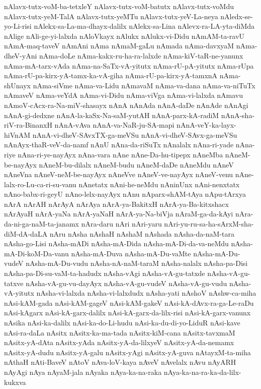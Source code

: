 {nAlavx-tutx-voM-ba-tetxleY
nAlavx-tutx-voM-batutx
nAlavx-tutx-voMdu
nAlavx-tutx-yeM-TalA
nAlavx-tutx-yeMTu
nAlavx-tutx-yeV-La-neya
nAledx-se-yo-Li-risi
nAlekx-sa-La-ma-dhayx-dalilx
nAlekx-sa-Lina
nAlevx-ra-LA-yta-diMda
nAlige
nAli-ge-yi-lalxda
nAloVkayx
nAlukx
nAlukx-vi-Didu
nAmAM-ta-ravU
nAmA-maq-taveV
nAmAni
nAma
nAmaM-gaLu
nAmada
nAma-davxyaM
nAma-dheV-yAni
nAma-doLe
nAma-kakx-ru-ha-ra-lalxde
nAma-kiV-taR-ne-yanunx
nAma-mA-tarx-vAda
nAma-na-SaTx-vA-yitutx
nAma-rU-pA-yitutx
nAma-rUpa
nAma-rU-pa-kirx-yA-tamx-ka-vA-giha
nAma-rU-pa-kirx-yA-tamxnA
nAma-shUnayx
nAma-siVme
nAma-va-Lidu
nAmavaM
nAma-va-dana
nAma-va-niTuTx
nAmaveV
nAma-veYdA
nAma-vi-Didu
nAma-viVga
nAma-vi-lalxda
nAmavu
nAmoV-cAcx-ra-Na-miV-shasayx
nAnA
nAnAda
nAnA-daDe
nAnAde
nAnAgi
nAnA-gi-dedxne
nAnA-la-kaSx-Na-saM-yutAH
nAnA-parx-kA-radiM
nAnA-sha-riV-ra-BinanxH
nAnA-vAva
nAnA-va-NaR-ju-SA-mapi
nAnA-veY-ka-layx-hiVnAM
nAnA-vi-dheV-SAvxTX-ga-meVSu
nAnA-vi-dheV-SAvx-ga-meVSu
nAnAyx-thaR-veV-da-namf
nAnU
nAna-da-riSuTx
nAnalalx
nAna-ri-yade
nAna-riye
nAna-ri-ye-nayAyx
nAna-vara
nAne
nAne-Da-hu-tipepx
nAneMba
nAneM-be-nayAyx
nAneM-bu-dilalx
nAneM-budu
nAneM-daDe
nAneMdu
nAneV
nAneVna
nAneV-neM-be-nayAyx
nAneVve
nAneV-ve-nayAyx
nAneV-venu
nAne-lalx-ro-Lu-ca-ri-su-vanu
nAnetatx
nAni-he-neMdu
nAninUnx
nAni-nenxtatx
nAno-babx-ri-geyU
nAno-lelx-nayAyx
nAnu
nAparx-shAM-tAya
nApu-tArxya
nArA
nArAH
nArAyA
nArAya
nArA-ya-BakitxH
nArA-ya-Ba-kitxshacx
nArAyaH
nArA-yaNa
nArA-yaNaH
nArA-ya-Na-biVja
nAraM-ga-da-kAyi
nAra-da-ni-ga-naM-ta-janamx
nAra-daru
nAri
nAri-yaru
nAri-yu-ru-sa-ha-sArxM-sha-diM-dA-daLA
nAru
nAsha
nAshaH
nAshaM
nAshada
nAsha-da-naM-tara
nAsha-go-Lisi
nAsha-mADi
nAsha-mA-Dida
nAsha-mA-Di-da-va-neMdu
nAsha-mA-Di-koM-Da-vanu
nAsha-mA-Duva
nAsha-mA-Du-vaMte
nAsha-mA-Du-vudeV
nAsha-mA-Du-vudu
nAsha-nA-naM-taraM
nAsha-nalalx
nAsha-pa-Disi
nAsha-pa-Di-su-vaM-ta-hadudx
nAsha-vAgi
nAsha-vA-gu-tatxde
nAsha-vA-gu-tatxve
nAsha-vA-gu-vu-dayAyx
nAsha-vA-gu-vudeV
nAsha-vA-gu-vudu
nAsha-vA-yitutx
nAsha-vi-lalxda
nAsha-vi-lalxdudx
nAsha-yati
nAshoV
nAshw-ca-miha
nAsi-kAM-gada
nAsi-kAM-gageV
nAsi-kAM-gakeV
nAsi-kA-dAvx-ra-ga-Le-raDu
nAsi-kAgarx
nAsi-kA-garx-dalilx
nAsi-kA-garx-da-lilx-risi
nAsi-kA-garx-vanunx
nAsika
nAsi-ka-dalilx
nAsi-ka-do-Li-hudu
nAsi-ka-du-di-yo-LiduR
nAsi-kave
nAsi-ra-daLa
nAsitx
nAsitx-ka-ma-tada
nAsitx-kiM-cana
nAsitx-tavxmaM
nAsitx-yA-dAta
nAsitx-yAda
nAsitx-yA-da-lilxyeV
nAsitx-yA-da-nemamx
nAsitx-yA-dudu
nAsitx-yA-galu
nAsitx-yAgi
nAsitx-yA-guva
nAtayxM-ta-miha
nAthaH
nAti-BaveV
nAtoV
nAva-loV-kaya
nAveV
nAvelalx
nAvu
nAyARH
nAyAgi
nAya
nAyaM-jala
nAyaka
nAya-ka-na-raka
nAya-ka-na-ra-ka-da-lilx-kukxva
}
